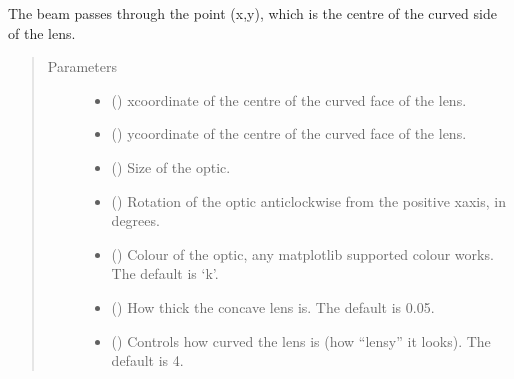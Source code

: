 \documentclass[letterpaper,10pt,english]{sphinxmanual}
\begin{document}
\begin{fulllineitems}
\begin{fulllineitems}
\sphinxAtStartPar
The beam passes through the point (x,y), which is the centre of the curved
side of the lens.
\begin{quote}\begin{description}
\item[{Parameters}] \leavevmode\begin{itemize}
\item {} 
\sphinxAtStartPar
{} () \textendash{} x\sphinxhyphen{}coordinate of the centre of the curved face of the lens.

\item {} 
\sphinxAtStartPar
{} () \textendash{} y\sphinxhyphen{}coordinate of the centre of the curved face of the lens.

\item {} 
\sphinxAtStartPar
{} () \textendash{} Size of the optic.

\item {} 
\sphinxAtStartPar
{} () \textendash{} Rotation of the optic anticlockwise from the positive x\sphinxhyphen{}axis, in
degrees.

\item {} 
\sphinxAtStartPar
{} (\sphinxstyleliteralemphasis{\sphinxupquote{, }}) \textendash{} Colour of the optic, any matplotlib supported colour works.
The default is ‘k’.

\item {} 
\sphinxAtStartPar
{} (\sphinxstyleliteralemphasis{\sphinxupquote{, }}) \textendash{} How thick the concave lens is. The default is 0.05.

\item {} 
\sphinxAtStartPar
{} (\sphinxstyleliteralemphasis{\sphinxupquote{, }}) \textendash{} Controls how curved the lens is (how “lens\sphinxhyphen{}y” it looks). The default is 4.


\end{itemize}
\end{description}
\end{quote}
\end{fulllineitems}
\end{fulllineitems}
\end{document}
